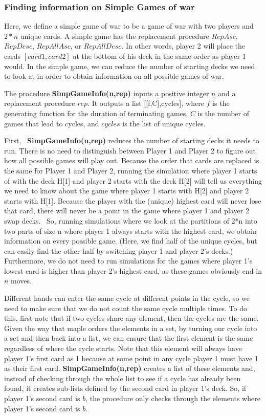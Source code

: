 \documentclass[12pt]{amsart}
\begin{document}
\subsubsection{Finding information on Simple Games of war} \hfill


Here, we define a simple game of war to be a game of war with two players and $2*n$ unique cards. A simple game has the replacement procedure $RepAsc$, $RepDesc$, $RepAllAsc$, or $RepAllDesc$. In other words, player 2 will place the cards $[card1, card2]$ at the bottom of his deck in the same order as player 1 would. In the simple game, we can reduce the number of starting decks we need to look at in order to obtain information on all possible games of war. 


The procedure \textbf{SimpGameInfo(n,rep)} inputs a positive integer $n$ and a replacement procedure $rep$. It outputs a list [[f,C],cycles], where $f$ is the generating function for the duration of terminating games, $C$ is the number of games that lead to cycles, and $cycles$ is the list of unique cycles.


First,  \textbf{SimpGameInfo(n,rep)} reduces the number of starting decks it needs to run. There is no need to distinguish between Player 1 and Player 2 to figure out how all possible games will play out. Because the order that cards are replaced is the same for Player 1 and Player 2, running the simulation where player 1 starts of with the deck H[1] and player 2 starts with the deck H[2] will tell us everything we need to know about the game where player 1 starts with H[2] and player 2 starts with H[1]. Because the player with the (unique) highest card will never lose that card, there will never be a point in the game where player 1 and player 2 swap decks.  So, running simulations where we look at the partitions of 2*n into two parts of size n where player 1 always starts with the highest card, we obtain information on every possible game. (Here, we find half of the unique cycles, but can easily find the other half by switching player 1 and player 2's decks.) Furthermore, we do not need to run simulations for the games where player 1's lowest card is higher than player 2's highest card, as these games obviously end in $n$ moves.


Different hands can enter the same cycle at different points in the cycle, so we need to make sure that we do not count the same cycle multiple times. To do this, first note that if two cycles share any element, then the cycles are the same. Given the way that maple orders the elements in a set, by turning our cycle into a set and then back into a list, we can ensure that the first element is the same regardless of where the cycle starts. Note that this element will always have player 1's first card as 1 because at some point in any cycle player 1 must have 1 as their first card. \textbf{SimpGameInfo(n,rep)} creates a list of these elements and, instead of checking through the whole list to see if a cycle has already been found, it creates sub-lists defined by the second card in player 1's deck. So, if player 1's second card is $b$, the procedure only checks through the elements where player 1's second card is $b$.
\end{document}
